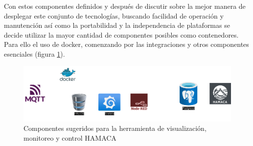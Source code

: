 Con estos componentes definidos y después de discutir sobre la mejor manera de desplegar este conjunto de tecnologías, buscando facilidad de operación y manutención así como la portabilidad y la independencia de plataformas se decide utilizar la mayor cantidad de componentes posibles como contenedores. Para ello el uso de docker\cite{docker}, comenzando por las integraciones y otros componentes esenciales (figura \ref{fig:componentes_hamaca}).\\

\begin{figure}[!htb]
\centering
\includegraphics[scale=0.35]{./Figuras/componentes_hamaca.png}
\caption{Componentes sugeridos para la herramienta de visualización, monitoreo y control HAMACA}
\label{fig:componentes_hamaca}
\vspace*{-10pt}
\end{figure}

